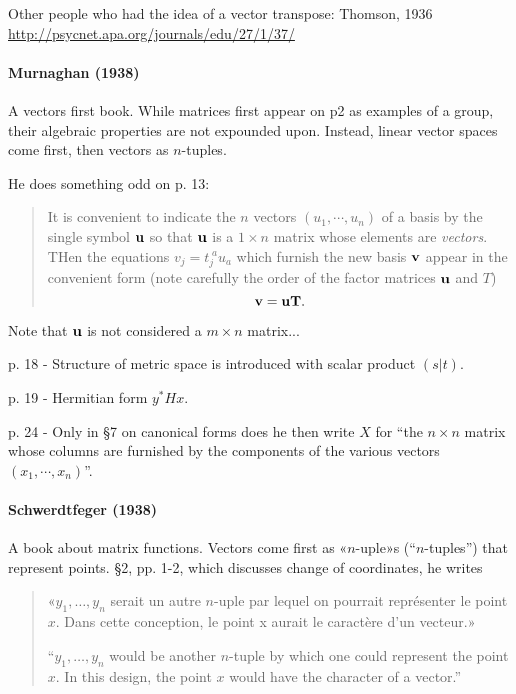 Other people who had the idea of a vector transpose:
Thomson, 1936
\url{http://psycnet.apa.org/journals/edu/27/1/37/}


\paragraph{Murnaghan (1938)~\cite{Murnaghan1938}}

A vectors first book. While matrices first appear on p2 as examples of a group,
their algebraic properties are not expounded upon. Instead, linear vector spaces
come first, then vectors as $n$-tuples.

He does something odd on p. 13:

\begin{quote}
    It is convenient to indicate the $n$ vectors $(u_1, \cdots, u_n)$ of a basis
    by the single symbol $\bf u$ so that $\bf u$ is a $1\times n$ matrix
    whose elements are \textit{vectors}. THen the equations $v_j = t_j^{\;a} u_a$
    which furnish the new basis $\bf v$ appear in the convenient form (note
    carefully the order of the factor matrices $\bf u$ and $T$)
    \[
    \bf v = \bf u T.
    \]
\end{quote}

Note that $\bf u$ is not considered a $m\times n$ matrix...

p. 18 - Structure of metric space is introduced with scalar product $(s|t)$.

p. 19 - Hermitian form $y^* H x$.

p. 24 - Only in \S7 on canonical forms does he then write $X$ for ``the $n\times n$
matrix whose columns are furnished by the components of the various vectors
$(x_1, \cdots, x_n)$''.


\paragraph{Schwerdtfeger (1938)~\cite{Schwerdtfeger1938}}

A book about matrix functions.
Vectors come first as «$n$-uple»s (``$n$-tuples'') that represent points. \S 2, pp. 1-2, which discusses change of coordinates, he writes
\begin{quote}
«$y_1, \dots, y_n$ serait un autre $n$-uple par lequel on pourrait représenter le point $x$. Dans cette conception, le point x aurait le caractère d'un vecteur.»

``$y_1, \dots, y_n$ would be another $n$-tuple by which one could represent the point $x$. In this design, the point $x$ would have the character of a vector.''
\end{quote}

